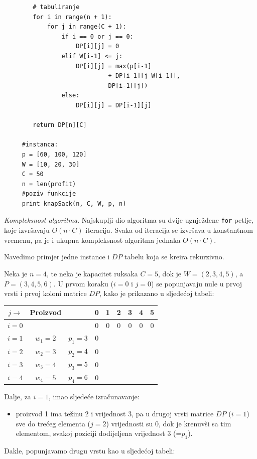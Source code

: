 \begin{solution}
\begin{verbatim}
	 	# tabuliranje
	 	for i in range(n + 1):
	 		for j in range(C + 1):
	 			if i == 0 or j == 0:
	 				DP[i][j] = 0
	 			elif W[i-1] <= j:
	 				DP[i][j] = max(p[i-1]
	 				         + DP[i-1][j-W[i-1]],
	 				         DP[i-1][j])
	 			else:
	 				DP[i][j] = DP[i-1][j]
	 
	 	return DP[n][C]
	 
	 #instanca:
	 p = [60, 100, 120]
	 W = [10, 20, 30]
	 C = 50
	 n = len(profit)
	 #poziv funkcije
	 print knapSack(n, C, W, p, n)
	 \end{verbatim}
	 
 \textit{Kompleksnost algoritma}. Najskuplji dio algoritma su dvije ugnježdene \texttt{for} petlje, koje izvršavaju $O(n \cdot C)$ iteracija. Svaka od iteracija se izvršava u konstantnom vremenu, pa je i ukupna kompleksnost algoritma jednaka $O(n \cdot C)$.
\end{solution}

Navedimo primjer jedne instance i $DP$ tabelu koja se kreira rekurzivno. 

Neka je $n = 4$, te neka je kapacitet ruksaka $C= 5$, dok je  $W = (2, 3, 4, 5)$, a $P = (3, 4, 5, 6)$. 
 U prvom koraku ($i=0$ i $j =0$) se popunjavaju nule u prvoj vrsti i prvoj koloni matrice $DP$, kako je prikazano u sljedećoj tabeli:
  \begin{table}[H]
 	\centering
 	\begin{tabular}{|c|cc|cccccc|}\hline
 
  	$j\rightarrow$     & Proizvod   &              &	 	0	&1&	2	&3	&4	&5 \\ \hline
        
 $i=0$ & 	& 	    & 	        0	&0	&0	&0	&0	&0  \\
 $i=1$ &	$w_1=2$	&$p_1=3$ &	0	& 	& 	& 	& 	&\\ 
 $i=2$ &	$w_2=3$	&$p_2=4$ &	0   &	& 	& 	&	&\\	 
 $i=3$ &	$w_3=4$	&$p_3=5$ &	0	& 	& 	& 	& 	&\\ 
 $i=4$ &	$w_4=5$ &$p_4=6$ &	0	& 	& 	& 	& 	&\\ \hline
 \end{tabular}
\end{table}
 
 Dalje, za $i = 1$, imao sljedeće izračunavanje: 
 \begin{itemize}
 	\item proizvod 1 ima težinu 2 i vrijednost 3, pa u drugoj vrsti matrice $DP$ ($i=1$) sve do trećeg elementa ($j=2$) vrijednosti su 0, dok je krenuvši sa tim elementom, svakoj poziciji dodijeljena vrijednost 3 (=$p_1$). 
 \end{itemize}
Dakle, popunjavamo drugu vrstu kao u sljedećoj tabeli:
 
